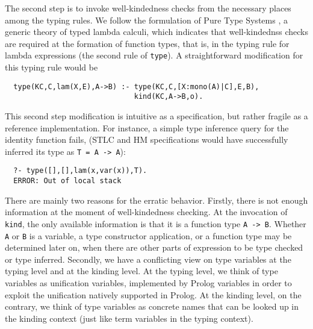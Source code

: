 \documentclass[runningheads,a4paper]{llncs}
\begin{document}
The second step is to invoke well-kindedness checks from the necessary
places among the typing rules. We follow the formulation of Pure Type
Systems \cite{Barendregt91}, a generic theory of typed lambda calculi,
which indicates that well-kindednss checks are required at the
formation of function types, that is, in the typing rule for lambda
expressions (the second rule of \verb|type|).
A straightforward modification for this typing rule would be
\begin{verbatim}
  type(KC,C,lam(X,E),A->B) :- type(KC,C,[X:mono(A)|C],E,B),
                              kind(KC,A->B,o).
\end{verbatim}
This second step modification is intuitive as a specification, but
rather fragile as a reference implementation. For instance,
a simple type inference query for the identity function fails,
(STLC and HM specifications would have successfully
inferred its type as \verb|T = A -> A|):
\begin{verbatim}
  ?- type([],[],lam(x,var(x)),T).
  ERROR: Out of local stack
\end{verbatim}

There are mainly two reasons for the erratic behavior.
Firstly, there is not enough information at the moment of
well-kindedness checking. At the invocation of \verb|kind|,
the only available information is that it is a function type \verb|A -> B|.
Whether \verb|A| or \verb|B| is a variable, a type constructor application,
or a function type may be determined later on, when there are other parts
of expression to be type checked or type inferred. Secondly, we have
a conflicting view on type variables at the typing level and
at the kinding level. At the typing level, we think of type variables as
unification variables, implemented by Prolog variables in order to exploit
the unification natively supported in Prolog. At the kinding level,
on the contrary, we think of type variables as concrete names that
can be looked up in the kinding context (just like term variables
in the typing context).
\end{document}
